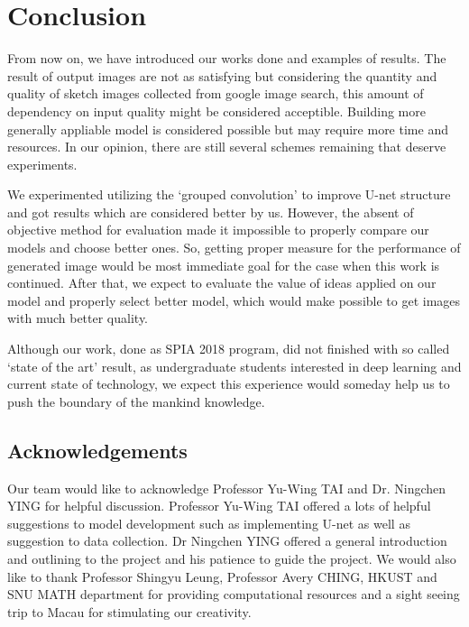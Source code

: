 \chapter{Conclusion}\label{Ch:Conclusion}

From now on, we have introduced our works done and examples of results. The result of output images are not as satisfying but considering the quantity and quality of sketch images collected from google image search, this amount of dependency on input quality might be considered acceptible. Building more generally appliable model is considered possible but may require more time and resources. In our opinion, there are still several schemes remaining that deserve experiments.

We experimented utilizing the `grouped convolution' to improve U-net structure and got results which are considered better by us. However, the absent of objective method for evaluation made it impossible to properly compare our models and choose better ones. So, getting proper measure for the performance of generated image would be most immediate goal for the case when this work is continued. After that, we expect to evaluate the value of ideas applied on our model and properly select better model, which would make possible to get images with much better quality.


Although our work, done as SPIA 2018 program, did not finished with so called `state of the art' result, as undergraduate students interested in deep learning and current state of technology, we expect this experience would someday help us to push the boundary of the mankind knowledge. 

\section{Acknowledgements}

Our team would like to acknowledge Professor Yu-Wing TAI and Dr. Ningchen YING for helpful discussion. Professor Yu-Wing TAI offered a lots of helpful suggestions to model development such as implementing U-net as well as suggestion to data collection. Dr Ningchen YING offered a general introduction and outlining to the project and his patience to guide the project. We would also like to thank Professor Shingyu Leung, Professor Avery CHING, HKUST and SNU MATH department for providing computational resources and a sight seeing trip to Macau for stimulating our creativity. 

\endinput
